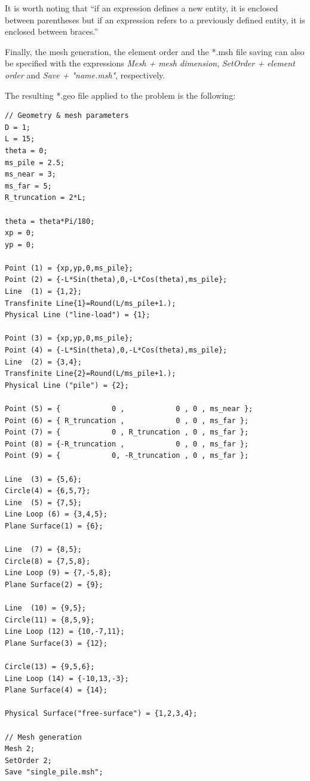 \documentclass[a4]{article}
\begin{document}
It is worth noting that “if an expression defines a new entity, it is enclosed between parentheses but if an expression refers to a previously defined entity, it is enclosed between braces.” \cite{gmshweb}

Finally, the mesh generation, the element order and the *.msh file saving can also be specified with the expressions \textit{Mesh + mesh dimension}, \textit{SetOrder + element order} and \textit{Save + "name.msh"}, respectively.

The resulting *.geo file applied to the problem is the following:

\begin{Verbatim}
// Geometry & mesh parameters
D = 1;
L = 15;
theta = 0;
ms_pile = 2.5;
ms_near = 3;
ms_far = 5;
R_truncation = 2*L;

theta = theta*Pi/180; 
xp = 0;           
yp = 0;

Point (1) = {xp,yp,0,ms_pile};
Point (2) = {-L*Sin(theta),0,-L*Cos(theta),ms_pile};
Line  (1) = {1,2};
Transfinite Line{1}=Round(L/ms_pile+1.);
Physical Line ("line-load") = {1};

Point (3) = {xp,yp,0,ms_pile};
Point (4) = {-L*Sin(theta),0,-L*Cos(theta),ms_pile};
Line  (2) = {3,4};
Transfinite Line{2}=Round(L/ms_pile+1.);
Physical Line ("pile") = {2};

Point (5) = {            0 ,            0 , 0 , ms_near };
Point (6) = { R_truncation ,            0 , 0 , ms_far };
Point (7) = {            0 , R_truncation , 0 , ms_far };
Point (8) = {-R_truncation ,            0 , 0 , ms_far };
Point (9) = {            0, -R_truncation , 0 , ms_far };

Line  (3) = {5,6};
Circle(4) = {6,5,7};
Line  (5) = {7,5};
Line Loop (6) = {3,4,5}; 
Plane Surface(1) = {6};

Line  (7) = {8,5};
Circle(8) = {7,5,8};
Line Loop (9) = {7,-5,8}; 
Plane Surface(2) = {9};

Line  (10) = {9,5};
Circle(11) = {8,5,9};
Line Loop (12) = {10,-7,11}; 
Plane Surface(3) = {12};

Circle(13) = {9,5,6};
Line Loop (14) = {-10,13,-3}; 
Plane Surface(4) = {14};

Physical Surface("free-surface") = {1,2,3,4};

// Mesh generation
Mesh 2;
SetOrder 2;
Save "single_pile.msh";
\end{Verbatim}
\end{document}
